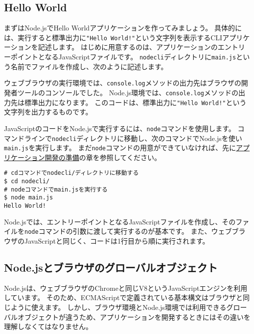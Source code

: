 \hypertarget{hello-world}{%
\subsection{Hello World}\label{hello-world}}

まずはNode.jsでHello Worldアプリケーションを作ってみましょう。
具体的には、実行すると標準出力に\texttt{"Hello World!"}という文字列を表示するCLIアプリケーションを記述します。
はじめに用意するのは、アプリケーションのエントリーポイントとなるJavaScriptファイルです。
\texttt{nodecli}ディレクトリに\texttt{main.js}という名前でファイルを作成し、次のように記述します。



ウェブブラウザの実行環境では、\texttt{console.log}メソッドの出力先はブラウザの開発者ツールのコンソールでした。
Node.js環境では、\texttt{console.log}メソッドの出力先は標準出力になります。
このコードは、標準出力に\texttt{"Hello World!"}という文字列を出力するものです。

JavaScriptのコードをNode.jsで実行するには、\texttt{node}コマンドを使用します。
コマンドラインで\texttt{nodecli}ディレクトリに移動し、次のコマンドでNode.jsを使い\texttt{main.js}を実行します。
まだ\texttt{node}コマンドの用意ができていなければ、先に\href{../../setup-local-env/README.md}{アプリケーション開発の準備}の章を参照してください。

\begin{lstlisting}
# cdコマンドでnodecli/ディレクトリに移動する
$ cd nodecli/
# nodeコマンドでmain.jsを実行する
$ node main.js
Hello World!
\end{lstlisting}

Node.jsでは、エントリーポイントとなるJavaScriptファイルを作成し、そのファイルを\texttt{node}コマンドの引数に渡して実行するのが基本です。
また、ウェブブラウザのJavaScriptと同じく、コードは1行目から順に実行されます。

\hypertarget{global-objects}{%
\subsection{Node.jsとブラウザのグローバルオブジェクト}\label{global-objects}}

Node.jsは、ウェブブラウザのChromeと同じV8というJavaScriptエンジンを利用しています。
そのため、ECMAScriptで定義されている基本構文はブラウザと同じように使えます。
しかし、ブラウザ環境とNode.js環境では利用できるグローバルオブジェクトが違うため、アプリケーションを開発するときにはその違いを理解しなくてはなりません。

